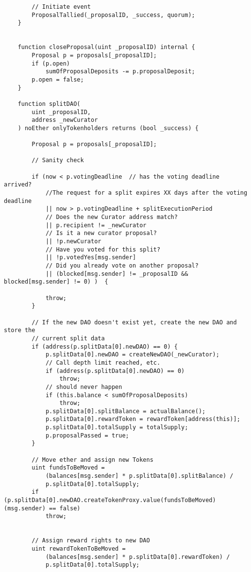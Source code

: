 \documentclass[9pt,oneside]{amsart}
\begin{document}
\begin{appendix}
\begin{verbatim}
        // Initiate event
        ProposalTallied(_proposalID, _success, quorum);
    }


    function closeProposal(uint _proposalID) internal {
        Proposal p = proposals[_proposalID];
        if (p.open)
            sumOfProposalDeposits -= p.proposalDeposit;
        p.open = false;
    }

    function splitDAO(
        uint _proposalID,
        address _newCurator
    ) noEther onlyTokenholders returns (bool _success) {

        Proposal p = proposals[_proposalID];

        // Sanity check

        if (now < p.votingDeadline  // has the voting deadline arrived?
            //The request for a split expires XX days after the voting deadline
            || now > p.votingDeadline + splitExecutionPeriod
            // Does the new Curator address match?
            || p.recipient != _newCurator
            // Is it a new curator proposal?
            || !p.newCurator
            // Have you voted for this split?
            || !p.votedYes[msg.sender]
            // Did you already vote on another proposal?
            || (blocked[msg.sender] != _proposalID && blocked[msg.sender] != 0) )  {

            throw;
        }

        // If the new DAO doesn't exist yet, create the new DAO and store the
        // current split data
        if (address(p.splitData[0].newDAO) == 0) {
            p.splitData[0].newDAO = createNewDAO(_newCurator);
            // Call depth limit reached, etc.
            if (address(p.splitData[0].newDAO) == 0)
                throw;
            // should never happen
            if (this.balance < sumOfProposalDeposits)
                throw;
            p.splitData[0].splitBalance = actualBalance();
            p.splitData[0].rewardToken = rewardToken[address(this)];
            p.splitData[0].totalSupply = totalSupply;
            p.proposalPassed = true;
        }

        // Move ether and assign new Tokens
        uint fundsToBeMoved =
            (balances[msg.sender] * p.splitData[0].splitBalance) /
            p.splitData[0].totalSupply;
        if (p.splitData[0].newDAO.createTokenProxy.value(fundsToBeMoved)(msg.sender) == false)
            throw;


        // Assign reward rights to new DAO
        uint rewardTokenToBeMoved =
            (balances[msg.sender] * p.splitData[0].rewardToken) /
            p.splitData[0].totalSupply;


\end{verbatim}
\end{appendix}
\end{document}
